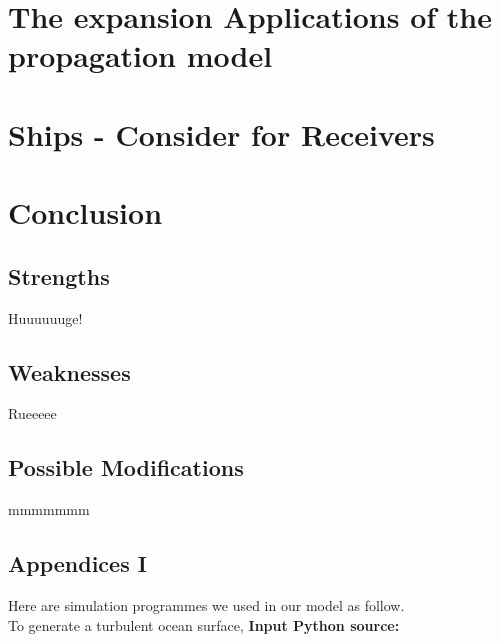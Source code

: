 \documentclass{mcmthesis}
\begin{document}
\section{The expansion Applications of the propagation model}

\section{Ships - Consider for Receivers}

\section{Conclusion}
  \subsection{Strengths}
    Huuuuuuge!
  \subsection{Weaknesses}
    Rueeeee
  \subsection{Possible Modifications}
    mmmmmmm


\newpage
%
%




\newpage
\begin{appendices}

  \section{Appendices I}

    Here are simulation programmes we used in our model as follow.\\
    To generate a turbulent ocean surface,
    \textbf{\textcolor[rgb]{0.98,0.00,0.00}{Input Python source:}}


\end{appendices}
\end{document}
